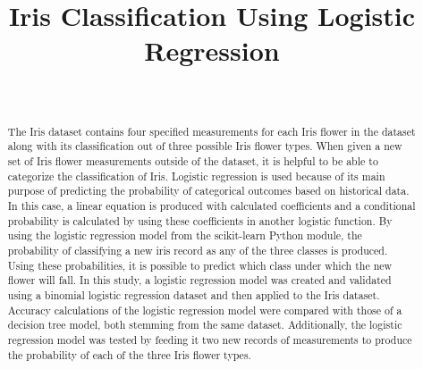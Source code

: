 \documentclass[journal]{IEEEtran}
\begin{document}
\setlength{\emergencystretch}{12pt}
\setlength{\parindent}{10pt}



\lstset{style=mystyle}

\title{Iris Classification Using Logistic Regression}

\author{
\\
}

\maketitle

\begin{abstract}
\label{log:abstract}
The Iris dataset contains four specified measurements for each Iris flower in the dataset along with its classification out of three possible Iris flower types. When given a new set of Iris flower measurements outside of the dataset, it is helpful to be able to categorize the classification of Iris. Logistic regression is used because of its main purpose of predicting the probability of categorical outcomes based on historical data. In this case, a linear equation is produced with calculated coefficients and a conditional probability is calculated by using these coefficients in another logistic function. By using the logistic regression model from the scikit-learn Python module, the probability of classifying a new iris record as any of the three classes is produced. Using these probabilities, it is possible to predict which class under which the new flower will fall. In this study, a logistic regression model was created and validated using a binomial logistic regression dataset and then applied to the Iris dataset. Accuracy calculations of the logistic regression model were compared with those of a decision tree model, both stemming from the same dataset. Additionally, the logistic regression model was tested by feeding it two new records of measurements to produce the probability of each of the three Iris flower types. 
\end{abstract}
\end{document}
